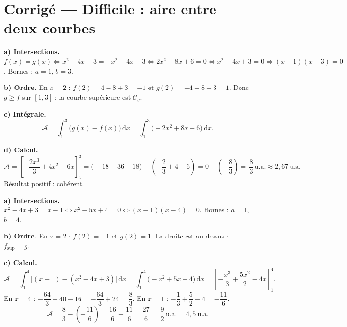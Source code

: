 \documentclass[11pt,a4paper]{article}
\newcommand{\dd}{\mathrm{d}}
\newcommand{\ua}{\,\text{u.a.}}
\begin{document}
\section*{Corrigé — Difficile : aire entre deux courbes}

\begin{corr}[D1]
\textbf{a) Intersections.} $f(x)=g(x)\Leftrightarrow x^2-4x+3=-x^2+4x-3\Leftrightarrow 2x^2-8x+6=0
\Leftrightarrow x^2-4x+3=0\Leftrightarrow (x-1)(x-3)=0$. Bornes : $a=1$, $b=3$.

\textbf{b) Ordre.} En $x=2$ : $f(2)=4-8+3=-1$ et $g(2)=-4+8-3=1$. Donc $g\geqslant f$ sur $[1,3]$ :
la courbe supérieure est $\mathcal{C}_g$.

\textbf{c) Intégrale.}
\[
\mathcal{A}=\int_1^3\bigl(g(x)-f(x)\bigr)\,\dd x
=\int_1^3\bigl(-2x^2+8x-6\bigr)\,\dd x.
\]

\textbf{d) Calcul.}
\[
\mathcal{A}=\left[-\frac{2x^3}{3}+4x^2-6x\right]_1^3
=\bigl(-18+36-18\bigr)-\left(-\frac{2}{3}+4-6\right)=0-\left(-\frac{8}{3}\right)
=\boxed{\,\frac{8}{3}\ua\approx 2{,}67\ \text{u.a.}}
\]
Résultat positif : cohérent. \checkmark
\end{corr}

\begin{corr}[D2]
\textbf{a) Intersections.} $x^2-4x+3=x-1\Leftrightarrow x^2-5x+4=0\Leftrightarrow (x-1)(x-4)=0$.
Bornes : $a=1$, $b=4$.

\textbf{b) Ordre.} En $x=2$ : $f(2)=-1$ et $g(2)=1$. La droite est au-dessus : $f_{\text{sup}}=g$.

\textbf{c) Calcul.}
\[
\mathcal{A}=\int_1^4\bigl[(x-1)-(x^2-4x+3)\bigr]\,\dd x=\int_1^4\bigl(-x^2+5x-4\bigr)\,\dd x
=\left[-\frac{x^3}{3}+\frac{5x^2}{2}-4x\right]_1^4.
\]
En $x=4$ : $-\dfrac{64}{3}+40-16=-\dfrac{64}{3}+24=\dfrac{8}{3}$. \quad
En $x=1$ : $-\dfrac{1}{3}+\dfrac{5}{2}-4=-\dfrac{11}{6}$.
\[
\mathcal{A}=\frac{8}{3}-\left(-\frac{11}{6}\right)=\frac{16}{6}+\frac{11}{6}=\frac{27}{6}
=\boxed{\,\frac{9}{2}\ua=4{,}5\ \text{u.a.}}
\]

\smallskip
\begin{center}
\end{center}
\end{corr}
\end{document}
